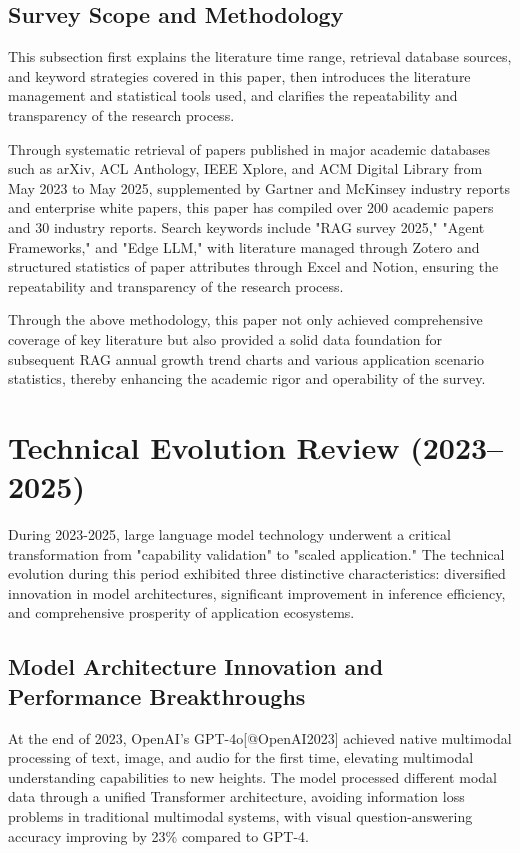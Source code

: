 \documentclass{article}
\begin{document}
\subsection{Survey Scope and Methodology}
This subsection first explains the literature time range, retrieval database sources, and keyword strategies covered in this paper, then introduces the literature management and statistical tools used, and clarifies the repeatability and transparency of the research process.

Through systematic retrieval of papers published in major academic databases such as arXiv, ACL Anthology, IEEE Xplore, and ACM Digital Library from May 2023 to May 2025, supplemented by Gartner and McKinsey industry reports and enterprise white papers, this paper has compiled over 200 academic papers and 30 industry reports. Search keywords include "RAG survey 2025," "Agent Frameworks," and "Edge LLM," with literature managed through Zotero and structured statistics of paper attributes through Excel and Notion, ensuring the repeatability and transparency of the research process.

Through the above methodology, this paper not only achieved comprehensive coverage of key literature but also provided a solid data foundation for subsequent RAG annual growth trend charts and various application scenario statistics, thereby enhancing the academic rigor and operability of the survey. 

\section{Technical Evolution Review (2023–2025)}
During 2023-2025, large language model technology underwent a critical transformation from "capability validation" to "scaled application." The technical evolution during this period exhibited three distinctive characteristics: diversified innovation in model architectures, significant improvement in inference efficiency, and comprehensive prosperity of application ecosystems.

\subsection{Model Architecture Innovation and Performance Breakthroughs}
At the end of 2023, OpenAI's GPT-4o[@OpenAI2023] achieved native multimodal processing of text, image, and audio for the first time, elevating multimodal understanding capabilities to new heights. The model processed different modal data through a unified Transformer architecture, avoiding information loss problems in traditional multimodal systems, with visual question-answering accuracy improving by 23\% compared to GPT-4.
\end{document}
